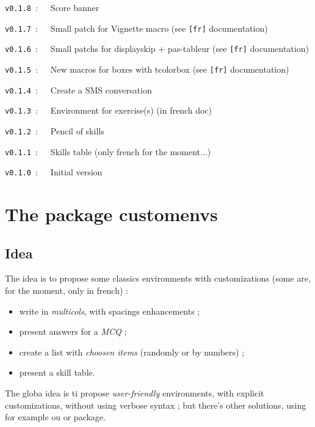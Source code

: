 \documentclass[english,11pt,a4paper]{article}
\begin{document}
\verb|v0.1.8|~:~~~Score banner

\verb|v0.1.7|~:~~~Small patch for \textsf{Vignette} macro (see \texttt{[fr]} documentation)

\verb|v0.1.6|~:~~~Small patchs for \textsf{displayskip} + \textsf{pas-tableur} (see \texttt{[fr]} documentation)

\verb|v0.1.5|~:~~~New macros for boxes with \textsf{tcolorbox} (see \texttt{[fr]} documentation)

\verb|v0.1.4|~:~~~Create a SMS conversation

\verb|v0.1.3|~:~~~Environment for exercise(s) (in french doc)

\verb|v0.1.2|~:~~~Pencil of skills

\verb|v0.1.1|~:~~~Skills table (only french for the moment...)

\verb|v0.1.0|~:~~~Initial version

\vspace*{5mm}

\pagebreak

\section{The package customenvs}

\subsection{Idea}

The idea is to propose some classics environments with customizations (some are, for the moment, only in french) :

\begin{itemize}
	\item write in \textit{multicols}, with spacings enhancements ;
	\item present answers for a \textit{MCQ} ;
	\item create a list with \textit{choosen items} (randomly or by numbers) ;
	\item present a skill table.
\end{itemize}

\smallskip

The globa idea is ti propose \textit{user-friendly} environments, with explicit customizations, without using verbose syntax ; but there's other solutions, using for example  ou  or  package.
\end{document}
